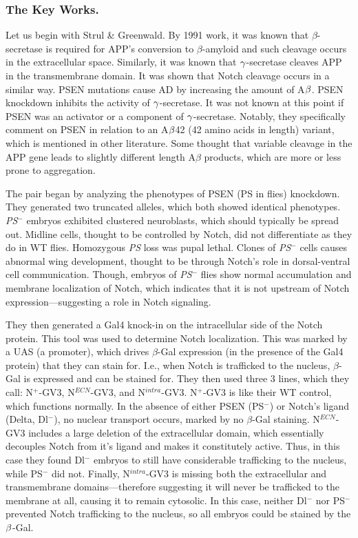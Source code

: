 \subsubsection*{The Key Works.}

Let us begin with Strul \& Greenwald. By 1991 work, it was known that $\beta$-secretase is required for APP's conversion to $\beta$-amyloid and such cleavage occurs in the extracellular space. Similarly, it was known that $\gamma$-secretase cleaves APP in the transmembrane domain. It was shown that Notch cleavage occurs in a similar way. PSEN mutations cause AD by increasing the amount of A$\beta$. PSEN knockdown inhibits the activity of $\gamma$-secretase. It was not known at this point if PSEN was an activator or a component of $\gamma$-secretase. Notably, they specifically comment on PSEN in relation to an A$\beta$42 (42 amino acids in length) variant, which is mentioned in other literature. Some thought that variable cleavage in the APP gene leads to slightly different length A$\beta$ products, which are more or less prone to aggregation.\newline

The pair began by analyzing the phenotypes of PSEN (PS in flies) knockdown. They generated two truncated alleles, which both showed identical phenotypes. \textit{PS}$^-$ embryos exhibited clustered neuroblasts, which should typically be spread out. Midline cells, thought to be controlled by Notch, did not differentiate as they do in WT flies. Homozygous \textit{PS} loss was pupal lethal. Clones of \textit{PS}$^-$ cells causes abnormal wing development, thought to be through Notch's role in dorsal-ventral cell communication. Though, embryos of \textit{PS}$^-$ flies show normal accumulation and membrane localization of Notch, which indicates that it is not upstream of Notch expression---suggesting a role in Notch signaling.\newline

They then generated a Gal4 knock-in on the intracellular side of the Notch protein. This tool was used to determine Notch localization. This was marked by a UAS (a promoter), which drives $\beta$-Gal expression (in the presence of the Gal4 protein) that they can stain for. I.e., when Notch is trafficked to the nucleus, $\beta$-Gal is expressed and can be stained for. They then used three 3 lines, which they call: N$^+$-GV3, N$^{ECN}$-GV3, and N$^{intra}$-GV3. N$^+$-GV3 is like their WT control, which functions normally. In the absence of either PSEN (PS$^-$) or Notch's ligand (Delta, Dl$^-$), no nuclear transport occurs, marked by no $\beta$-Gal staining. N$^{ECN}$-GV3 includes a large deletion of the extracellular domain, which essentially decouples Notch from it's ligand and makes it constitutely active. Thus, in this case they found Dl$^-$ embryos to still have considerable trafficking to the nucleus, while PS$^-$ did not. Finally, N$^{intra}$-GV3 is missing both the extracellular and transmembrane domains---therefore suggesting it will never be trafficked to the membrane at all, causing it to remain cytosolic. In this case, neither Dl$^-$ nor PS$^-$ prevented Notch trafficking to the nucleus, so all embryos could be stained by the $\beta$-Gal.\newline

